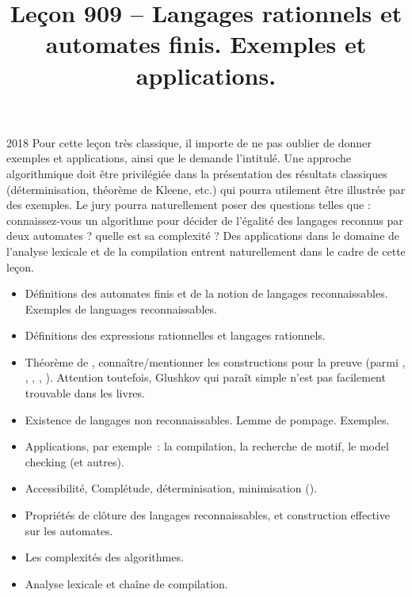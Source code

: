 \documentclass{agregfiche}
\title{Leçon 909 -- Langages rationnels et automates finis.  Exemples et applications.}
\begin{document}
\maketitle

\secrapports

\begin{rapport}{2018}
Pour cette leçon très classique, il importe de ne pas oublier de donner exemples et applications, ainsi
que le demande l’intitulé.
Une approche algorithmique doit être privilégiée dans la présentation des résultats classiques (déterminisation, théorème de
Kleene, etc.) qui pourra utilement être illustrée par des exemples. Le jury pourra naturellement poser des questions telles que : connaissez-vous un algorithme pour décider de l’égalité des langages reconnus par deux automates ? quelle est sa complexité ?
Des applications dans le domaine de l’analyse lexicale et de la compilation entrent naturellement dans
le cadre de cette leçon.
\end{rapport}

\secindispensables

\begin{itemize}
\item  Définitions des automates finis et de la notion de langages reconnaissables. Exemples de languages reconnaissables.
\item Définitions des expressions rationnelles et langages rationnels.
\item Théorème de , connaître/mentionner les constructions pour la preuve (parmi , , , , ). Attention toutefois, Glushkov qui paraît simple n'est pas facilement trouvable dans les livres.
\end{itemize}

\secasavoir

\begin{itemize}
	\item Existence de langages non reconnaissables. Lemme de pompage. Exemples.
	\item Applications, par exemple~: la compilation, la recherche de motif, le
	model checking (et autres).
	\item Accessibilité, Complétude, déterminisation, minimisation ().
	\item Propriétés de clôture des langages reconnaissables, et construction
	effective sur les automates.
	\item Les complexités des algorithmes.
  	\item Analyse lexicale et chaîne de compilation.
\end{itemize}
\end{document}
